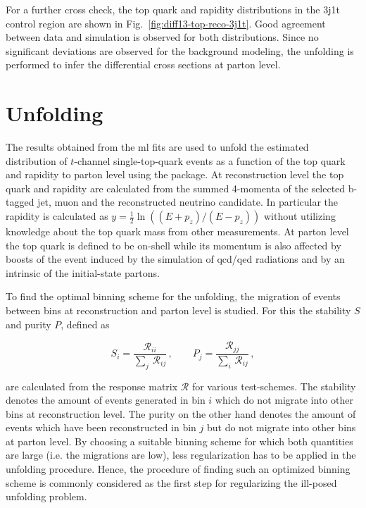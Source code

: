 For a further cross check, the top quark \pt and rapidity distributions in the 3j1t \ttbar control region are shown in Fig.~\ref{fig:diff13-top-reco-3j1t}. Good agreement between data and simulation is observed for both distributions. Since no significant deviations are observed for the background modeling, the unfolding is performed to infer the differential cross sections at parton level.


\section{Unfolding}
\label{sec:diff13-unfolding}

The results obtained from the \gls{ml} fits are used to unfold the estimated distribution of $t$-channel single-top-quark events as a function of the top quark \pt and rapidity to parton level using the \TUNFOLD package. At reconstruction level the top quark \pt and rapidity are calculated from the summed 4-momenta of the selected b-tagged jet, muon and the reconstructed neutrino candidate. In particular the rapidity is calculated as $y=\frac{1}{2}\ln((E+p_{z})/(E-p_{z}))$ without utilizing knowledge about the top quark mass from other measurements. At parton level the top quark is defined to be on-shell while its momentum is also affected by boosts of the event induced by the simulation of \gls{qcd}/\gls{qed} radiations and by an intrinsic \kt of the initial-state partons. 

To find the optimal binning scheme for the unfolding, the migration of events between bins at reconstruction and parton level is studied. For this the stability $S$ and purity $P$, defined as 

\begin{equation}
S_{i}=\frac{\mathcal{R}_{ii}}{\sum\limits_{j}\,\mathcal{R}_{ij}}\,,\qquad P_{j}=\frac{\mathcal{R}_{jj}}{\sum\limits_{i}\,\mathcal{R}_{ij}}\,,
\end{equation}

are calculated from the response matrix $\mathcal{R}$ for various test-schemes. The stability denotes the amount of events generated in bin $i$ which do not migrate into other bins at reconstruction level. The purity on the other hand denotes the amount of events which have been reconstructed in bin $j$ but do not migrate into other bins at parton level. By choosing a suitable binning scheme for which both quantities are large (i.e. the migrations are low), less regularization has to be applied in the unfolding procedure. Hence, the procedure of finding such an optimized binning scheme is commonly considered as the first step for regularizing the ill-posed unfolding problem.

